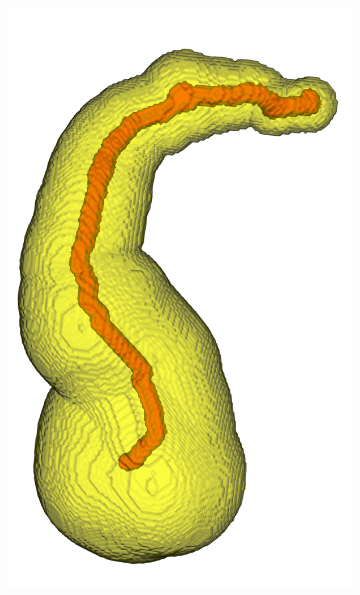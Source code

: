 \documentclass[review]{elsarticle}
\begin{document}
\begin{figure}[t]
  \centering
  \begin{subfigure}[b]{.22\linewidth}
    \centering
    \includegraphics[width=\textwidth]{fig5a.png}
    \label{fig:initial_segmentation} 
  \end{subfigure}%
  \hspace{0.5em}
  \begin{subfigure}[b]{.40\linewidth}
    \centering

\end{subfigure}
\end{figure}
\end{document}
